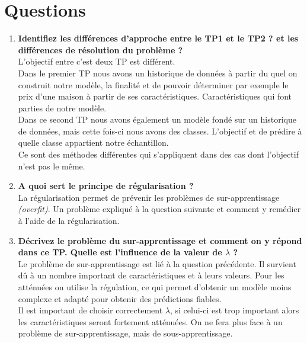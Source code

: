 \clearpage
\section{Questions}


\begin{enumerate}
    \item \textbf{Identifiez les différences d'approche entre le TP1 et le TP2 ? et les différences de résolution du problème ?}\\
    L'objectif entre c'est deux TP est différent. \\
    Dans le premier TP nous avons un historique de données à partir du quel on construit notre modèle, la finalité et de pouvoir déterminer par exemple le prix d'une maison à partir de ses caractéristiques. Caractéristiques qui 
    font parties de notre modèle. \\
    Dans ce second TP nous avons également un modèle fondé sur un historique de données, mais cette fois-ci nous avons des classes. L'objectif et de prédire à quelle classe appartient notre échantillon.\\
    
    Ce sont des méthodes différentes qui s'appliquent dans des cas dont l'objectif n'est pas le même.

    \vspace{0.5cm}
    
    \item \textbf{A quoi sert le principe de régularisation ?} \\
    La régularisation permet de prévenir les problèmes de sur-apprentissage \textit{(overfit)}. Un problème expliqué à la question suivante et comment y remédier à l'aide de la régularisation.
    \vspace{0.5cm}

    \item \textbf{Décrivez le problème du sur-apprentissage et comment on y répond dans ce TP. Quelle est l'influence de la valeur de $\lambda$ ?} \\
    Le problème de sur-apprentissage est lié à la question précédente. Il survient dû à un nombre important de caractéristiques et à leurs valeurs. Pour les atténuées on utilise la régulation, ce qui permet d'obtenir un 
    modèle moins complexe et adapté pour obtenir des prédictions fiables. \\
    Il est important de choisir correctement $\lambda$, si celui-ci est trop important alors les caractéristiques seront fortement atténuées. On ne fera plus face à un problème de sur-apprentissage, mais de sous-apprentissage.
    \vspace{0.5cm}


\end{enumerate}
